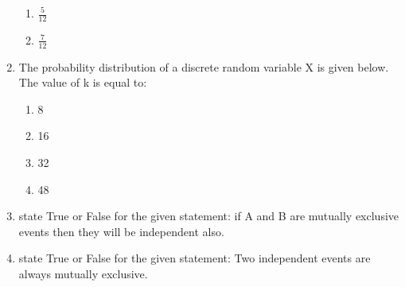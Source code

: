 \begin{enumerate}[label=\thesection.\arabic*,ref=\thesection.\theenumi]
\begin{enumerate}
	\item $\frac{5}{12}$ \vspace{2pt}
	\item $\frac{7}{12}$ \vspace{2pt}
\end{enumerate}

\item The probability distribution of a discrete random variable X is given below. The value of k is equal to:
\begin{table}[!ht]

\end{table}
\begin{enumerate}[label=(\alph*)]
\item 8
\item 16
\item 32
\item 48
\end{enumerate}

\item state True or False for the given statement:
if A and B are mutually exclusive events then they will be independent also.\\
\solution

\item state True or False for the given statement:
Two independent events are always mutually exclusive.\\
\solution

\end{enumerate}
